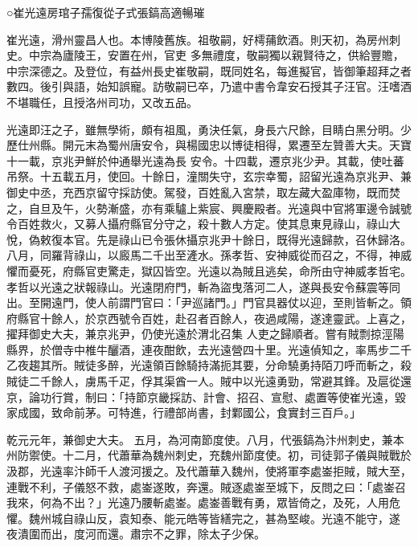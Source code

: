 
\begin{pinyinscope}

 ○崔光遠房琯子孺復從子式張鎬高適暢璀



 崔光遠，滑州靈昌人也。本博陵舊族。祖敬嗣，好樗蒱飲酒。則天初，為房州刺史。中宗為廬陵王，安置在州，官吏
 多無禮度，敬嗣獨以親賢待之，供給豐贍，中宗深德之。及登位，有益州長史崔敬嗣，既同姓名，每進擬官，皆御筆超拜之者數四。後引與語，始知誤寵。訪敬嗣已卒，乃遣中書令韋安石授其子汪官。汪嗜酒不堪職任，且授洛州司功，又改五品。



 光遠即汪之子，雖無學術，頗有祖風，勇決任氣，身長六尺餘，目睛白黑分明。少歷仕州縣。開元末為蜀州唐安令，與楊國忠以博徒相得，累遷至左贊善大夫。天寶十一載，京兆尹鮮於仲通舉光遠為長
 安令。十四載，遷京兆少尹。其載，使吐蕃吊祭。十五載五月，使回。十餘日，潼關失守，玄宗幸蜀，詔留光遠為京兆尹、兼御史中丞，充西京留守採訪使。駕發，百姓亂入宮禁，取左藏大盈庫物，既而焚之，自旦及午，火勢漸盛，亦有乘驢上紫宸、興慶殿者。光遠與中官將軍邊令誠號令百姓救火，又募人攝府縣官分守之，殺十數人方定。使其息東見祿山，祿山大悅，偽敕復本官。先是祿山已令張休攝京兆尹十餘日，既得光遠歸款，召休歸洛。
 八月，同羅背祿山，以廄馬二千出至滻水。孫孝哲、安神威從而召之，不得，神威懼而憂死，府縣官吏驚走，獄囚皆空。光遠以為賊且逃矣，命所由守神威孝哲宅。孝哲以光遠之狀報祿山。光遠閉府門，斬為盜曳落河二人，遂與長安令蘇震等同出。至開遠門，使人前謂門官曰：「尹巡諸門。」門官具器仗以迎，至則皆斬之。領府縣官十餘人，於京西號令百姓，赴召者百餘人，夜過咸陽，遂達靈武。上喜之，擢拜御史大夫，兼京兆尹，仍使光遠於渭北召集
 人吏之歸順者。嘗有賊剽掠涇陽縣界，於僧寺中椎牛釃酒，連夜酣飲，去光遠營四十里。光遠偵知之，率馬步二千乙夜趨其所。賊徒多醉，光遠領百餘騎持滿扼其要，分命驍勇持陌刀呼而斬之，殺賊徒二千餘人，虜馬千疋，俘其渠酋一人。賊中以光遠勇勁，常避其鋒。及扈從還京，論功行賞，制曰：「持節京畿採訪、計會、招召、宣慰、處置等使崔光遠，毀家成國，致命前茅。可特進，行禮部尚書，封鄴國公，食實封三百戶。」



 乾元元年，兼御史大夫。
 五月，為河南節度使。八月，代張鎬為汴州刺史，兼本州防禦使。十二月，代蕭華為魏州刺史，充魏州節度使。初，司徒郭子儀與賊戰於汲郡，光遠率汴師千人渡河援之。及代蕭華入魏州，使將軍李處崟拒賊，賊大至，連戰不利，子儀怒不救，處崟遂敗，奔還。賊逐處崟至城下，反問之曰：「處崟召我來，何為不出？」光遠乃腰斬處崟。處崟善戰有勇，眾皆倚之，及死，人用危懼。魏州城自祿山反，袁知泰、能元皓等皆繕完之，甚為堅峻。光遠不能守，遂
 夜潰圍而出，度河而還。肅宗不之罪，除太子少保。




\end{pinyinscope}
